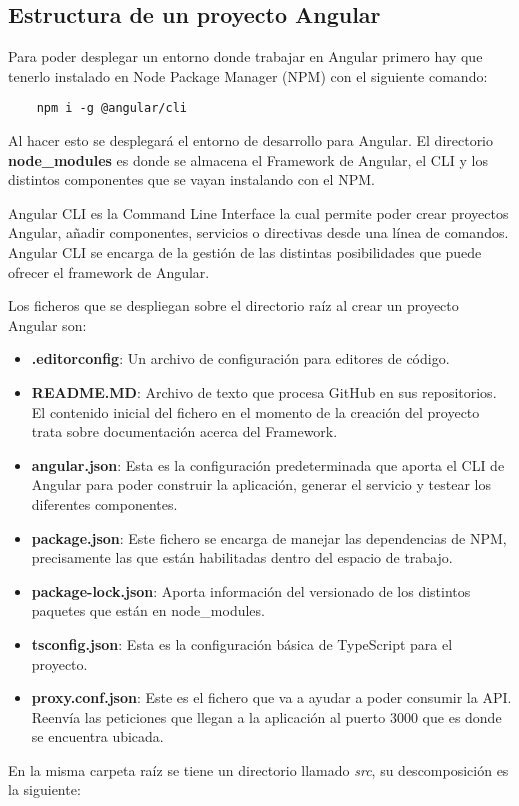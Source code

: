 \subsection{Estructura de un proyecto Angular}
Para poder desplegar un entorno donde trabajar en Angular primero hay que tenerlo instalado en Node Package Manager (NPM) con el siguiente comando:
\begin{verbatim}
    npm i -g @angular/cli
\end{verbatim}
Al hacer esto se desplegará el entorno de desarrollo para Angular. El directorio \textbf{node\_modules} es donde se almacena el Framework de Angular, el CLI y los distintos componentes que se vayan instalando con el NPM.
\begin{tcolorbox}
    [colback=green!5!white,colframe=green!75!black,fonttitle=\bfseries,title=¿Qué diferencias hay entre Angular CLI y Angular Framework?]
    Angular CLI es la Command Line Interface la cual permite poder crear proyectos Angular, añadir componentes, servicios o directivas desde una línea de comandos. Angular CLI se encarga de la gestión de las distintas posibilidades que puede ofrecer el framework de Angular.
\end{tcolorbox}
Los ficheros que se despliegan sobre el directorio raíz al crear un proyecto Angular son:
\begin{itemize}
    \item \textbf{.editorconfig}: Un archivo de configuración para editores de código.
    \item \textbf{README.MD}: Archivo de texto que procesa GitHub en sus repositorios. El contenido inicial del fichero en el momento de la creación del proyecto trata sobre documentación acerca del Framework.
    \item \textbf{angular.json}: Esta es la configuración predeterminada que aporta el CLI de Angular para poder construir la aplicación, generar el servicio y testear los diferentes componentes.
    \item \textbf{package.json}: Este fichero se encarga de manejar las dependencias de NPM, precisamente las que están habilitadas dentro del espacio de trabajo.
    \item \textbf{package-lock.json}: Aporta información del versionado de los distintos paquetes que están en node\_modules.
    \item \textbf{tsconfig.json}: Esta es la configuración básica de TypeScript para el proyecto.
    \item \textbf{proxy.conf.json}: Este es el fichero que va a ayudar a poder consumir la API. Reenvía las peticiones que llegan a la aplicación al puerto 3000 que es donde se encuentra ubicada.
\end{itemize}
En la misma carpeta raíz se tiene un directorio llamado \textit{src}, su descomposición es la siguiente:

